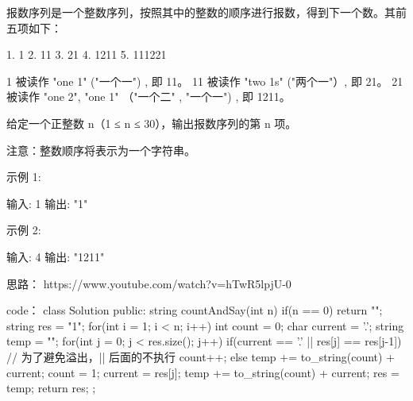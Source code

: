 报数序列是一个整数序列，按照其中的整数的顺序进行报数，得到下一个数。其前五项如下：

1.     1
2.     11
3.     21
4.     1211
5.     111221

1 被读作  "one 1"  ("一个一") , 即 11。
11 被读作 "two 1s" ("两个一"）, 即 21。
21 被读作 "one 2",  "one 1" （"一个二" ,  "一个一") , 即 1211。

给定一个正整数 n（1 ≤ n ≤ 30），输出报数序列的第 n 项。

注意：整数顺序将表示为一个字符串。

 

示例 1:

输入: 1
输出: "1"

示例 2:

输入: 4
输出: "1211"































思路：
https://www.youtube.com/watch?v=hTwR5lpjU-0



































code：
class Solution {
public:
    string countAndSay(int n) {
        if(n == 0) return "";
        string res = "1";
        for(int i = 1; i < n; i++)
        {
            int count = 0;
            char current = '.';
            string temp = "";
            for(int j = 0; j < res.size(); j++)
            {
                if(current == '.' || res[j] == res[j-1])   // 为了避免溢出，|| 后面的不执行
                {
                    count++;
                }
                else
                {
                    temp += to_string(count) + current;
                    count = 1;
                }
                current = res[j];
            }
            temp += to_string(count) + current;
            res = temp;
        }
        return res;
    }
};